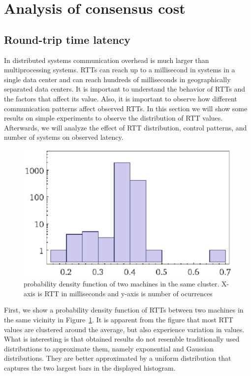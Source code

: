 \section{Analysis of consensus cost}\label{sec:analysis}


\subsection{Round-trip time latency}
In distributed systems communication overhead is much larger than multiprocessing systems. RTTs can reach up to a millisecond in systems in a single data center and can reach hundreds of milliseconds in geographically separated data centers. It is important to understand the behavior of RTTs and the factors that affect its value. Also, it is important to observe how different communication patterns affect observed RTTs. In this section we will show some results on simple experiments to observe the distribution of RTT values. Afterwards, we will analyze the effect of RTT distribution, control patterns, and number of systems on observed latency.

\begin{figure}[ht]
\centering
\includegraphics[scale=0.5]{img/rttpdf2.eps}
\caption{probability density function of two machines in the same cluster. X-axis is RTT in milliseconds and y-axis is number of ocurrences}
\label{fig:rttpdf}
\end{figure}

First, we show a probability density function of RTTs between two machines in the same vicinity in Figure~\ref{fig:rttpdf}. It is apparent from the figure that most RTT values are clustered around the average, but also experience variation in values. What is interesting is that obtained results do not resemble traditionally used distributions to approximate them, namely exponential and Gaussian distributions. They are better approximated by a uniform distribution that captures the two largest bars in the displayed histogram.

